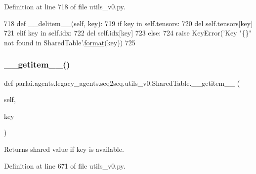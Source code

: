 Definition at line 718 of file utils\+\_\+v0.\+py.


\begin{DoxyCode}
718     \textcolor{keyword}{def }\_\_delitem\_\_(self, key):
719         \textcolor{keywordflow}{if} key \textcolor{keywordflow}{in} self.tensors:
720             del self.tensors[key]
721         \textcolor{keywordflow}{elif} key \textcolor{keywordflow}{in} self.idx:
722             del self.idx[key]
723         \textcolor{keywordflow}{else}:
724             \textcolor{keywordflow}{raise} KeyError(\textcolor{stringliteral}{'Key "\{\}" not found in SharedTable'}.\hyperlink{namespaceparlai_1_1chat__service_1_1services_1_1messenger_1_1shared__utils_a32e2e2022b824fbaf80c747160b52a76}{format}(key))
725 
\end{DoxyCode}
\mbox{\label{classparlai_1_1agents_1_1legacy__agents_1_1seq2seq_1_1utils__v0_1_1SharedTable_a0a5453d4cc84eb034e061f3fc53f7798}} 
\subsubsection{\texorpdfstring{\+\_\+\+\_\+getitem\+\_\+\+\_\+()}{\_\_getitem\_\_()}}
{\footnotesize\ttfamily def parlai.\+agents.\+legacy\+\_\+agents.\+seq2seq.\+utils\+\_\+v0.\+Shared\+Table.\+\_\+\+\_\+getitem\+\_\+\+\_\+ (\begin{DoxyParamCaption}\item[{}]{self,  }\item[{}]{key }\end{DoxyParamCaption})}

\begin{DoxyVerb}Returns shared value if key is available.
\end{DoxyVerb}
 

Definition at line 671 of file utils\+\_\+v0.\+py.


